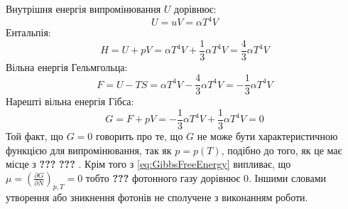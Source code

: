 \documentclass{article}
\begin{document}
Внутрішня енергія випромінювання $U$ дорівнює:
\begin{equation}
    \label{eq:InternalEnergyOfRadiation}
    U = uV = \alpha T^{4} V
\end{equation}
Ентальпія:
\begin{equation}
    \label{eq:Enthalpy}
    H = U + pV = \alpha T^{4} V + \frac{1}{3} \alpha T^{4} V = \frac{4}{3} \alpha T^{4} V
\end{equation}
Вільна енергія Гельмгольца:
\begin{equation}
    \label{eq:HelmholtzFreeEnergy}
    F = U - TS = \alpha T^{4} V - \frac{4}{3} \alpha T^{4} V = -\frac{1}{3} \alpha T^{4} V
\end{equation}
Нарешті вільна енергія Гібса:
\begin{equation}
    \label{eq:GibbsFreeEnergy}
    G = F + pV = -\frac{1}{3} \alpha T^{4} V + \frac{1}{3} \alpha T^{4} V = 0
\end{equation}
Той факт, що $G = 0$ говорить про те, що $G$ не може бути характеристичною функцією для випромінювання, так як $p = p(T)$, подібно до того, як це має місце з \textbf{???} \textbf{???} . Крім того з \eqref{eq:GibbsFreeEnergy} 
випливає, що $\mu = \left(\frac{\partial G}{\partial N}\right)_{p, T} = 0$ тобто \textbf{???} фотонного газу дорівнює $0$. Іншими словами утворення або зникнення фотонів не сполучене з виконанням роботи. 
\end{document}
